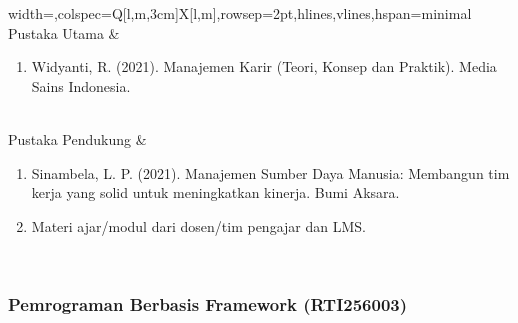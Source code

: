 \begin{longtblr}{width=\textwidth,colspec={Q[l,m,3cm]X[l,m]},rowsep=2pt,hlines,vlines,hspan=minimal}
Pustaka Utama & \begin{enumerate}\item Widyanti, R. (2021). Manajemen Karir (Teori, Konsep dan Praktik). Media Sains Indonesia.\end{enumerate} \\
Pustaka Pendukung & \begin{enumerate}\item Sinambela, L. P. (2021). Manajemen Sumber Daya Manusia: Membangun tim kerja yang solid untuk meningkatkan kinerja. Bumi Aksara.\item Materi ajar/modul dari dosen/tim pengajar dan LMS.\end{enumerate} \\
\end{longtblr}

\subsubsection*{Pemrograman Berbasis Framework (RTI256003)}
